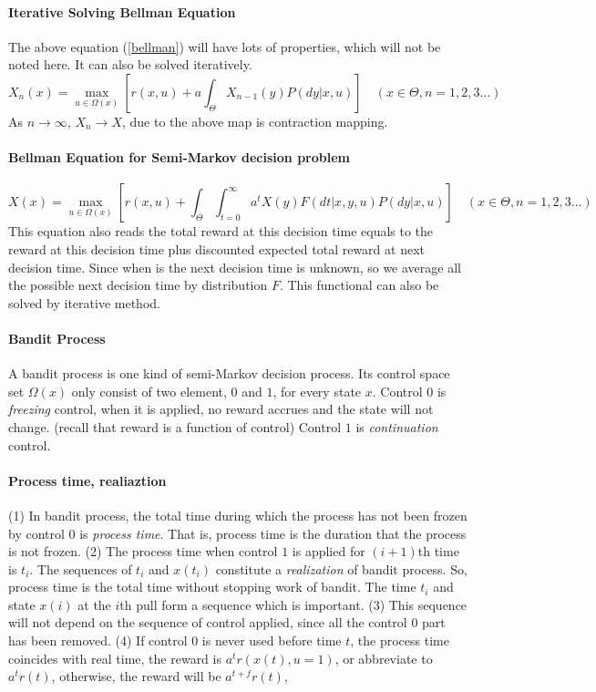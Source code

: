\paragraph{Iterative Solving Bellman Equation}
The above equation (\ref{bellman}) will have lots of properties, which will not be noted here. It can also be solved iteratively.
\[
	X_n(x) = \max_{u \in \Omega(x)} \left[ r(x,u) + a \int_{\Theta} X_{n-1}(y) P(dy | x,u) \right] \quad (x \in \Theta, n = 1, 2, 3 \ldots)
\]
As $n\rightarrow\infty$, $X_n\rightarrow X$, due to the above map is contraction mapping.


\paragraph{Bellman Equation for Semi-Markov decision problem}
\[
	X(x) = \max_{u \in \Omega(x)} \left[ r(x,u) + \int_{\Theta} \int_{t=0}^\infty a^t X(y) F(dt|x,y,u) P(dy | x,u) \right] \quad (x \in \Theta, n = 1, 2, 3 \ldots)
\]
This equation also reads the total reward at this decision time equals to the reward at this decision time plus discounted expected total reward at next 
decision time. Since when is the next decision time is unknown, so we average all the possible next decision time by distribution $F$.
This functional can also be solved by iterative method.

\paragraph{Bandit Process}
A bandit process is one kind of semi-Markov decision process. Its control space set $\Omega(x)$ only
consist of two element, $0$ and $1$, for every state $x$.
Control $0$ is \textit{freezing} control, when it is applied, no reward accrues and the state will
not change. (recall that reward is a function of control) Control $1$ is \textit{continuation} 
control.

\paragraph{Process time, realiaztion}
(1) In bandit process, the total time during which the process has not been frozen by control $0$ is
\textit{process time}. That is, process time is the duration that the process is not frozen.
(2) The process time when control $1$ is applied for $(i+1)$th time is $t_i$. The sequences of $t_i$ and
$x(t_i)$ constitute a \textit{realization} of bandit process.
So, process time is the total time without stopping work of bandit. The time $t_i$ and state $x(i)$
at the $i$th pull form a sequence which is important. (3) This sequence will not depend on the sequence
of control applied, since all the control $0$ part has been removed.
(4) If control $0$ is never used before time $t$, the process time coincides with real time, the reward is
$a^tr(x(t),u=1)$, or abbreviate to $a^tr(t)$, otherwise, the reward will be $a^{t+f}r(t)$,

